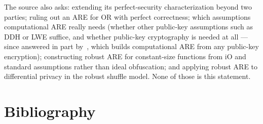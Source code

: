 \documentclass{aicr-conjecture}
\begin{document}
\begin{remark}
The source also asks: extending its perfect-security characterization
beyond two parties; ruling out an ARE for OR with perfect correctness;
which assumptions computational ARE really needs (whether other
public-key assumptions such as DDH or LWE suffice, and whether public-key
cryptography is needed at all --- since answered in part
by~\cite{BEG25}, which builds computational ARE from any public-key
encryption); constructing robust ARE for constant-size functions from iO
and standard assumptions rather than ideal obfuscation; and applying
robust ARE to differential privacy in the robust shuffle model. None of
those is this statement.
\end{remark}

\section{Bibliography}
\end{document}
